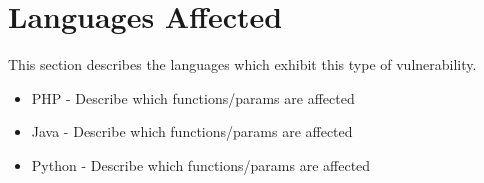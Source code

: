 \section{Languages Affected}

This section describes the languages which exhibit this type of vulnerability. 
\begin{itemize}
	\item PHP - Describe which functions/params are affected
	\item Java - Describe which functions/params are affected
	\item Python - Describe which functions/params are affected
\end{itemize}
 
